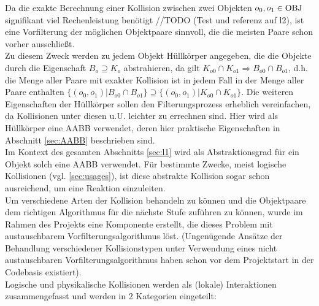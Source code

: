 
Da die exakte Berechnung einer Kollision zwischen zwei Objekten $o_0, o_1 \in \operatorname{OBJ}$ signifikant viel Rechenleistung benötigt //TODO (Test und referenz auf l2), ist eine Vorfilterung der möglichen Objektpaare sinnvoll, die die meisten Paare schon vorher ausschließt.\\
Zu diesem Zweck werden zu jedem Objekt Hüllkörper angegeben, die die Objekte durch die Eigenschaft $B_o \supseteq K_o$ abstrahieren, da gilt $K_{o0} \cap K_{o1} \Rightarrow B_{o0} \cap B_{o1}$, d.h.~ die Menge aller Paare mit exakter Kollision ist in jedem Fall in der Menge aller Paare enthalten $ \{ (o_0, o_1) | B_{o0} \cap B_{o1} \} \supseteq \{ (o_0, o_1) | K_{o0} \cap K_{o1} \} $.
Die weiteren Eigenschaften der Hüllkörper sollen den Filterungsprozess erheblich vereinfachen, da Kollisionen unter diesen u.U. leichter zu errechnen sind. Hier wird als Hüllkörper eine AABB verwendet, deren hier praktische Eigenschaften in Abschnitt \ref{sec:AABB} beschrieben sind.\\
Im Kontext des gesamten Abschnitts \ref{sec:l1} wird als Abstraktionsgrad für ein Objekt solch eine AABB verwendet. Für bestimmte Zwecke, meist logische Kollisionen (vgl. \ref{sec:usages}), ist diese abstrakte Kollision sogar schon ausreichend, um eine Reaktion einzuleiten.\\
Um verschiedene Arten der Kollision behandeln zu können und die Objektpaare dem richtigen Algorithmus für die nächste Stufe zuführen zu können, wurde im Rahmen des Projekts eine Komponente erstellt, die dieses Problem mit austauschbarem Vorfilterungsalgorithmus löst. (Ungenügende Ansätze der Behandlung verschiedener Kollisionstypen unter Verwendung eines nicht austauschbaren Vorfilterungsalgorithmus haben schon vor dem Projektstart in der Codebasis existiert). \\
Logische und physikalische Kollisionen werden als (lokale) Interaktionen zusammengefasst und werden in 2 Kategorien eingeteilt:
